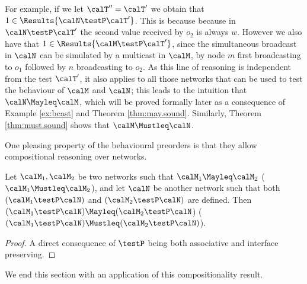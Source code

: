 \documentclass{LMCS}
\begin{document}
\begin{exa}
For example, if we let $\calT'' = \calT'$ we obtain that $1 \in \Results{\calN \testP \calT'}$. 
This is because because in $\calN \testP \calT'$ the second value received by $o_2$ is always $w$. 
However we also have that $1 \in \Results{\calM \testP \calT'}$, since the
simultaneous broadcast in $\calN$ can be simulated by a multicast in $\calM$, 
by node $m$ first broadcasting to $o_1$ followed by
$n$ broadcasting to $o_2$. As this line of reasoning is independent from the test $\calT'$, 
it also applies to all those networks that can be used to test the behaviour of $\calM$ and $\calN$; 
this leads to the intuition that $\calN \Mayleq \calM$, which will be proved formally later 
as a consequence of Example \ref{ex:bcast} and Theorem \ref{thm:may.sound}. 
Similarly, Theorem \ref{thm:must.sound} shows that $\calM \Mustleq \calN$.

\end{exa}

One pleasing property of the behavioural preorders is that they allow 
compositional reasoning over networks.
\begin{prop}[Compositionality]
\label{prop:compmay}
Let $\calM_1, \calM_2$ be two networks such that $\calM_1 \Mayleq \calM_2$ 
($\calM_1 \Mustleq \calM_2$), and 
let $\calN$ be another network such that both $(\calM_1 \testP \calN)$ and $(\calM_2 \testP \calN)$ 
are defined. Then $(\calM_1 \testP \calN) \Mayleq (\calM_2 \testP \calN$) 
($(\calM_1 \testP \calN) \Mustleq (\calM_2 \testP \calN)$).
\end{prop}
\begin{proof}
A direct consequence of $\testP$ being both associative and interface preserving.
\end{proof}
\noindent
We end this section with an 
application of this compositionality result.
\end{document}
